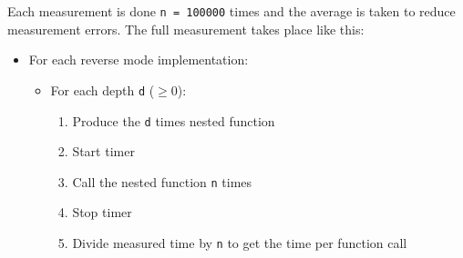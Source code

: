Each measurement is done \lstinline{n = 100000}  times and the average is taken to reduce measurement errors. The full measurement takes place like this:
\begin{itemize}
    \item
        For each reverse mode implementation:
        \begin{itemize}
            \item
                For each depth \lstinline{d} ($\geq 0$):
                \begin{enumerate}
                    \item Produce the \lstinline{d} times nested function
                    \item Start timer
                    \item Call the nested function \lstinline{n} times
                    \item Stop timer
                    \item Divide measured time by \lstinline{n} to get the time per function call
                \end{enumerate}
        \end{itemize}

\end{itemize}

